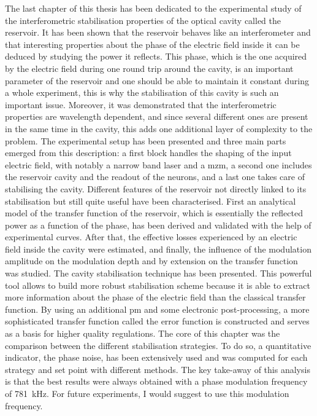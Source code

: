The last chapter of this thesis has been dedicated to the experimental study of the interferometric stabilisation properties of the optical cavity called the reservoir. It has been shown that the reservoir behaves like an interferometer and that interesting properties about the phase of the electric field inside it can be deduced by studying the power it reflects. This phase, which is the one acquired by the electric field during one round trip around the cavity, is an important parameter of the reservoir and one should be able to maintain it constant during a whole experiment, this is why the stabilisation of this cavity is such an important issue. Moreover, it was demonstrated that the interferometric properties are wavelength dependent, and since several different ones are present in the same time in the cavity, this adds one additional layer of complexity to the problem. The experimental setup has been presented and three main parts emerged from this description: a first block handles the shaping of the input electric field, with notably a narrow band laser and a \gls{mzm}, a second one includes the reservoir cavity and the readout of the neurons, and a last one takes care of stabilising the cavity. Different features of the reservoir not directly linked to its stabilisation but still quite useful have been characterised. First an analytical model of the transfer function of the reservoir, which is essentially the reflected power as a function of the phase, has been derived and validated with the help of experimental curves. After that, the effective losses experienced by an electric field inside the cavity were estimated, and finally, the influence of the modulation amplitude on the modulation depth and by extension on the transfer function was studied. The \pdh cavity stabilisation technique has been presented. This powerful tool allows to build more robust stabilisation scheme because it is able to extract more information about the phase of the electric field than the classical transfer function. By using an additional \gls{pm} and some electronic post-processing, a more sophisticated transfer function called the error function is constructed and serves as a basis for higher quality regulations. The core of this chapter was the comparison between the different stabilisation strategies. To do so, a quantitative indicator, the phase noise, has been extensively used and was computed for each strategy and set point with different methods. The key take-away of this analysis is that the best results were always obtained with a \pdh phase modulation frequency of \SI{781}{\kilo\hertz}. For future \rcer experiments, I would suggest to use this modulation frequency.\\

